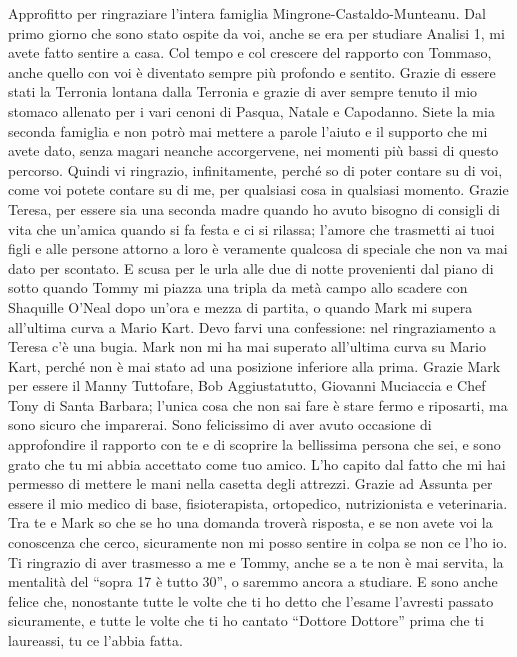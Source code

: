 \newline
Approfitto per ringraziare l'intera famiglia Mingrone-Castaldo-Munteanu. Dal primo giorno che sono stato ospite da voi, anche se era per studiare Analisi 1, mi avete fatto sentire a casa. Col tempo e col crescere del rapporto con Tommaso, anche quello con voi è diventato sempre più profondo e sentito. Grazie di essere stati la Terronia lontana dalla Terronia e grazie di aver sempre tenuto il mio stomaco allenato per i vari cenoni di Pasqua, Natale e Capodanno. Siete la mia seconda famiglia e non potrò mai mettere a parole l'aiuto e il supporto che mi avete dato, senza magari neanche accorgervene, nei momenti più bassi di questo percorso. Quindi vi ringrazio, infinitamente, perché so di poter contare su di voi, come voi potete contare su di me, per qualsiasi cosa in qualsiasi momento.
\newline
Grazie Teresa, per essere sia una seconda madre quando ho avuto bisogno di consigli di vita che un'amica quando si fa festa e ci si rilassa; l'amore che trasmetti ai tuoi figli e alle persone attorno a loro è veramente qualcosa di speciale che non va mai dato per scontato. E scusa per le urla alle due di notte provenienti dal piano di sotto quando Tommy mi piazza una tripla da metà campo allo scadere con Shaquille O'Neal dopo un'ora e mezza di partita, o quando Mark mi supera all'ultima curva a Mario Kart.
\newline 
Devo farvi una confessione: nel ringraziamento a Teresa c'è una bugia. Mark non mi ha mai superato all'ultima curva su Mario Kart, perché non è mai stato ad una posizione inferiore alla prima. Grazie Mark per essere il Manny Tuttofare, Bob Aggiustatutto, Giovanni Muciaccia e Chef Tony di Santa Barbara; l'unica cosa che non sai fare è stare fermo e riposarti, ma sono sicuro che imparerai. Sono felicissimo di aver avuto occasione di approfondire il rapporto con te e di scoprire la bellissima persona che sei, e sono grato che tu mi abbia accettato come tuo amico. L'ho capito dal fatto che mi hai permesso di mettere le mani nella casetta degli attrezzi.
\newline
Grazie ad Assunta per essere il mio medico di base, fisioterapista, ortopedico, nutrizionista e veterinaria. Tra te e Mark so che se ho una domanda troverà risposta, e se non avete voi la conoscenza che cerco, sicuramente non mi posso sentire in colpa se non ce l'ho io.
Ti ringrazio di aver trasmesso a me e Tommy, anche se a te non è mai servita, la mentalità del ``sopra 17 è tutto 30'', o saremmo ancora a studiare. E sono anche felice che, nonostante tutte le volte che ti ho detto che l'esame l'avresti passato sicuramente, e tutte le volte che ti ho cantato ``Dottore Dottore'' prima che ti laureassi, tu ce l'abbia fatta.
